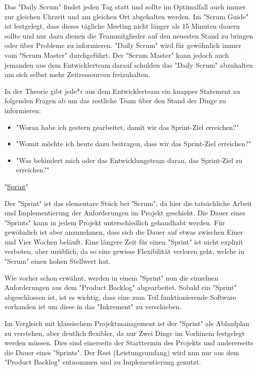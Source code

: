 Das "Daily Scrum" findet jeden Tag statt und sollte im Optimalfall auch immer  zur gleichen Uhrzeit und am gleichen Ort abgehalten werden. Im "Scrum Guide" ist festgelegt, dass dieses tägliche Meeting nicht länger als 15 Minuten dauern sollte und nur dazu dienen die Teammitglieder auf den neuesten Stand zu bringen oder über Probleme zu informieren. "Daily Scrum" wird für gewöhnlich immer vom "Scrum Master" durchgeführt. Der "Scrum Master" kann jedoch auch jemanden aus dem Entwicklerteam darauf schulden das "Daily Scrum" abzuhalten um sich selbst mehr Zeitressourcen freizuhalten.

In der Theorie gibt jede*r aus dem Entwicklerteam ein knappes Statement zu folgenden Fragen ab um das restliche Team über den Stand der Dinge zu informieren:

\begin{itemize}
    \item "Woran habe ich gestern gearbeitet, damit wir das Sprint-Ziel erreichen?" \cite{DailyScrum}
    \item "Womit möchte ich heute dazu beitragen, dass wir das Sprint-Ziel erreichen?" \cite{DailyScrum}
    \item "Was behindert mich oder das Entwicklungsteam daran, das Sprint-Ziel zu erreichen?" \cite{DailyScrum}
\end{itemize}

"\underline{Sprint}"

Der "Sprint" ist das elementare Stück bei "Scrum", da hier die tatsächliche Arbeit und Implementierung der Anforderungen im Projekt geschieht. Die Dauer eines "Sprints" kann in jedem Projekt unterschiedlich gehandhabt werden. Für gewöhnlich ist aber anzunehmen, dass sich die Dauer auf etwas zwischen Einer und Vier Wochen beläuft. Eine längere Zeit für einen "Sprint" ist nicht explizit verboten, aber unüblich, da so eine gewisse Flexibilität verloren geht, welche in "Scrum" einen hohen Stellwert hat.

Wie vorher schon erwähnt, werden in einem "Sprint" nun die einzelnen Anforderungen aus dem "Product Backlog" abgearbeitet. Sobald ein "Sprint" abgeschlossen ist, ist es wichtig, dass eine zum Teil funktionierende Software vorhanden ist um diese in das "Inkrement" zu verschieben.

Im Vergleich mit klassischem Projektmanagement ist der "Sprint" als Ablaufplan zu verstehen, aber deutlich flexibler, da nur Zwei Dinge im Vorhinein festgelegt werden müssen. Dies sind einerseits der Starttermin des Projekts und andererseits die Dauer eines "Sprints". Der Rest (Leistungsumfang) wird nun nur aus dem "Product Backlog" entnommen und zu Implementierung genutzt. \cite{Sprint}

